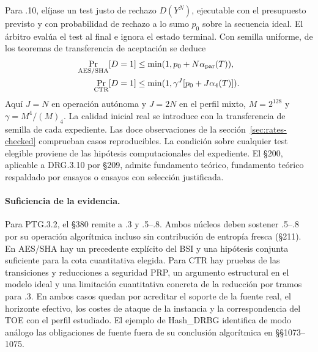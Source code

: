 Para .10, elíjase un test justo de rechazo \(D(Y^N)\), ejecutable con el
presupuesto previsto y con probabilidad de rechazo a lo sumo \(p_0\) sobre
la secuencia ideal. El árbitro evalúa el test al final e ignora el estado
terminal. Con semilla uniforme, de los teoremas de transferencia de aceptación
se deduce
\[
\begin{aligned}
 \Pr_{\rm AES/SHA}[D=1]&\le\min(1,p_0+N\alpha_{\rm par}(T)),\\
 \Pr_{\rm CTR}[D=1]&\le\min(1,\gamma^J[p_0+J\alpha_4(T)]) .
\end{aligned}
\]
Aquí \(J=N\) en operación autónoma y \(J=2N\) en el perfil mixto,
\(M=2^{128}\) y \(\gamma=M^4/(M)_4\).
La calidad inicial real se introduce con la transferencia de semilla de
cada expediente. Las doce observaciones de la sección~\ref{sec:rates-checked}
comprueban casos reproducibles. La condición sobre cualquier test elegible
proviene de las hipótesis computacionales del expediente. El §200, aplicable
a DRG.3.10 por §209, admite fundamento teórico, fundamento teórico respaldado
por ensayos o ensayos con selección justificada.

\paragraph{Suficiencia de la evidencia.}
Para PTG.3.2, el §380 remite a .3 y .5--.8. Ambos núcleos deben sostener .5--.8
por su operación algorítmica incluso sin contribución de entropía fresca (§211).
En AES/SHA hay un precedente explícito del BSI y una hipótesis conjunta
suficiente para la cota cuantitativa elegida. Para CTR hay pruebas de las
transiciones y reducciones a seguridad PRP, un argumento estructural en el
modelo ideal y una limitación cuantitativa concreta de la reducción por
tramos para .3. En ambos casos quedan por acreditar el soporte de la fuente
real, el horizonte efectivo, los costes de ataque de la instancia y la
correspondencia del TOE con el perfil estudiado. El ejemplo de Hash\_DRBG
identifica de modo análogo las obligaciones de fuente fuera de su conclusión
algorítmica en §§1073--1075.
